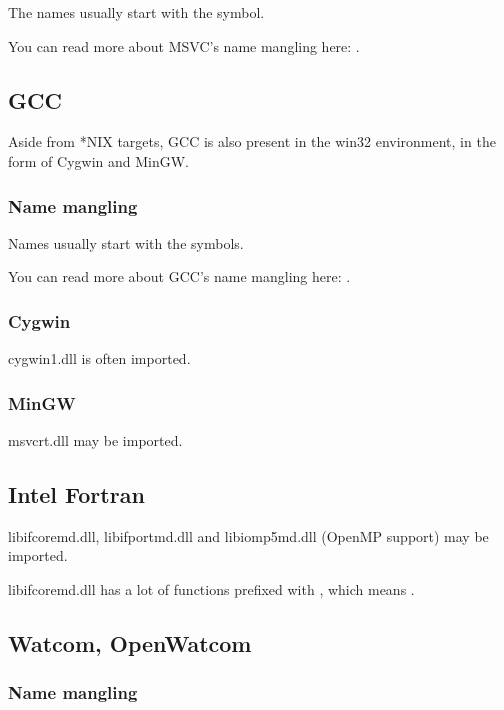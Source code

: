 The names usually start with the  symbol.

You can read more about MSVC's \gls{name mangling} here: .

\subsection{GCC}

Aside from *NIX targets, GCC is also present in the win32 environment, in the form of Cygwin and MinGW.

\subsubsection{Name mangling}

Names usually start with the  symbols.

You can read more about GCC's \gls{name mangling} here: .

\subsubsection{Cygwin}

cygwin1.dll is often imported.

\subsubsection{MinGW}

msvcrt.dll may be imported.

\subsection{Intel Fortran}

libifcoremd.dll, libifportmd.dll and libiomp5md.dll (OpenMP support) may be imported.

libifcoremd.dll has a lot of functions prefixed with , which means .

\subsection{Watcom, OpenWatcom}

\subsubsection{Name mangling}

